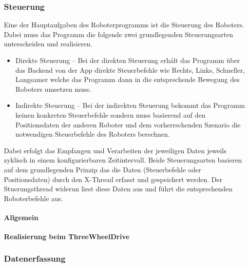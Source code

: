 \subsubsection{Steuerung}
Eine der Hauptaufgaben des Roboterprogramms ist die Steuerung des Roboters. Dabei muss das Programm die folgende zwei 
grundlegenden Steuerungsarten unterscheiden und realisieren.
\begin{itemize}
	\item{Direkte Steuerung} -- Bei der direkten Steuerung erhält das Programm über das Backend von der App direkte Steuerbefehle wie
	Rechts, Links, Schneller, Langsamer welche das Programm dann in die entsprechende Bewegung des Roboters umsetzen muss.
	\item{Indirekte Steuerung} -- Bei der indirekten Steuerung bekommt das Programm keinen konkreten Steuerbefehle sondern muss basierend
	auf den Positionsdaten der anderen Roboter und dem vorherrschenden Szenario die notwendigen Steuerbefehle des Roboters berechnen.
\end{itemize}
Dabei erfolgt das Empfangen und Verarbeiten der jeweiligen Daten jeweils zyklisch in einem konfigurierbaren Zeitintervall. Beide Steuerungsarten
basieren auf dem grundlegenden Prinzip das die Daten (Steuerbefehle oder Positionsdaten) durch den X-Thread erfasst und gespeichert werden.
Der Stuerungsthread widerun liest diese Daten aus und führt die entsprechenden Roboterbefehle aus.
\paragraph{Allgemein}
\paragraph{Realisierung beim ThreeWheelDrive}
\subsubsection{Datenerfassung}